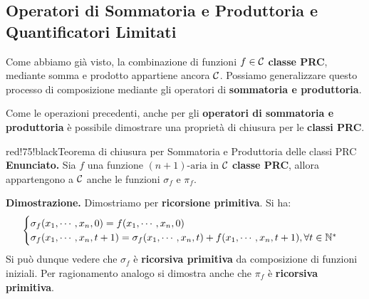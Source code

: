 \subsection{Operatori di Sommatoria e Produttoria e Quantificatori Limitati}

Come abbiamo già visto, la combinazione di funzioni \(f\in\mathcal{C}\) \textbf{classe PRC}, mediante somma e prodotto appartiene ancora \(\mathcal{C}\).
Possiamo generalizzare questo processo di composizione mediante gli operatori di \textbf{sommatoria e produttoria}.


Come le operazioni precedenti, anche per gli \textbf{operatori di sommatoria e produttoria} è possibile dimostrare una proprietà di chiusura per le \textbf{classi PRC}.

\begin{halfframedbox}{red!75!black}{Teorema di chiusura per Sommatoria e Produttoria delle classi PRC}\label{Teorema di chiusura per Sommatoria e Produttoria delle classi PRC}
  \textbf{Enunciato. } Sia \(f\) una funzione \((n+1)\text{-aria}\) in \(\mathcal{C}\) \textbf{classe PRC}, allora appartengono a \(\mathcal{C}\) anche le funzioni \(\sigma_f\) e \(\pi_f\).

  \begin{center}
    \textcolor{red!75!black}{\hdashrule[0.5ex]{18cm}{1pt}{3mm 3pt 1mm 2pt}}
  \end{center}

  \textbf{Dimostrazione. } Dimostriamo per \textbf{ricorsione primitiva}. Si ha:
  \begin{equation}
    \begin{cases}
      \sigma_f(x_1,\cdots,x_n,0)=f(x_1,\cdots,x_n,0)\\
      \sigma_f(x_1,\cdots,x_n,t+1)=\sigma_f(x_1,\cdots,x_n,t)+f(x_1,\cdots,x_n,t+1), \forall t \in \mathbb{N}^*
    \end{cases}
  \end{equation}
  Si può dunque vedere che \(\sigma_f\) è \textbf{ricorsiva primitiva} da composizione di funzioni iniziali.
  Per ragionamento analogo si dimostra anche che \(\pi_f\) è \textbf{ricorsiva primitiva}.
\end{halfframedbox}

